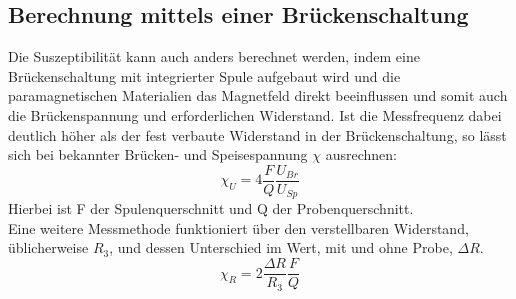 \subsection{Berechnung mittels einer Brückenschaltung}
Die Suszeptibilität kann auch anders berechnet werden, indem eine Brückenschaltung mit integrierter Spule aufgebaut wird und die paramagnetischen Materialien das Magnetfeld direkt beeinflussen und somit auch die Brückenspannung und erforderlichen Widerstand.
Ist die Messfrequenz dabei deutlich höher als der fest verbaute Widerstand in der Brückenschaltung, so lässt sich bei bekannter Brücken- und Speisespannung $\chi$ ausrechnen:
\begin{equation}
    \chi_U = 4\frac{F}{Q}\frac{U_{Br}}{U_{Sp}}
    \label{eq:chiu}
\end{equation}
Hierbei ist F der Spulenquerschnitt und Q der Probenquerschnitt.\\
Eine weitere Messmethode funktioniert über den verstellbaren Widerstand, üblicherweise $R_3$, und dessen Unterschied im Wert, mit und ohne Probe, $\Delta R$.
\begin{equation}
    \chi_R = 2\frac{\Delta R}{R_3}\frac{F}{Q}
    \label{eq:chir}
\end{equation} 
